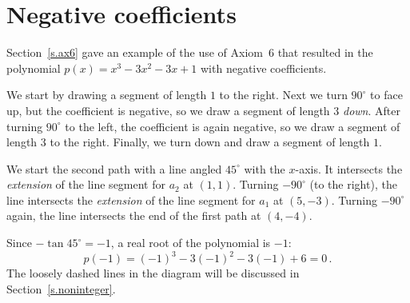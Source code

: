 \newpage

\section{Negative coefficients}\label{s.negative}

Section~\ref{s.ax6} gave an example of the use of Axiom~6 that resulted in the polynomial $p(x)=x^3-3x^2-3x+1$ with negative coefficients.

We start by drawing a segment of length $1$ to the right. Next we turn $90^\circ$ to face up, but the coefficient is negative, so we draw a segment of length $3$ \emph{down}. After turning $90^\circ$ to the left, the coefficient is again negative, so we draw a segment of length $3$ to the right. Finally, we turn down and draw a segment of length $1$.

We start the second path with a line angled $45^\circ$ with the $x$-axis. It intersects the \emph{extension} of the line segment for $a_2$ at $(1,1)$. Turning $-90^\circ$ (to the right), the line intersects the \emph{extension} of the line segment for $a_1$ at $(5,-3)$. Turning $-90^\circ$ again, the line intersects the end of the first path at $(4,-4)$.

Since $-\tan 45^\circ=-1$, a real root of the polynomial is $-1$:
\[
p(-1)=(-1)^3-3(-1)^2-3(-1)+6=0\,.
\]
The loosely dashed lines in the diagram will be discussed  in Section~\ref{s.noninteger}.

